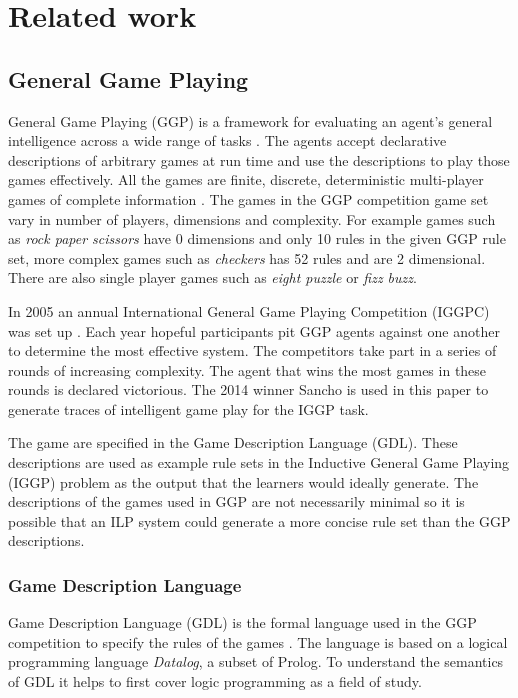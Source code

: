 \chapter{Related work}

\section{General Game Playing}

General Game Playing (GGP) is a framework for evaluating an agent's general intelligence across a wide range of tasks \cite{Cropper/IGGP,Genesereth/GGPOverview}. The agents accept declarative descriptions of arbitrary games at run time and use the descriptions to play those games effectively. All the games are finite, discrete, deterministic multi-player games of complete information \cite{GDL_Spec}. The games in the GGP competition game set vary in number of players, dimensions and complexity. For example games such as \textit{rock paper scissors} have 0 dimensions and only 10 rules in the given GGP rule set, more complex games such as \textit{checkers} has 52 rules and are 2 dimensional. There are also single player games such as \textit{eight puzzle} or \textit{fizz buzz}.

In 2005 an annual International General Game Playing Competition (IGGPC) was set up \cite{Kowalski/GGP}. Each year hopeful participants pit GGP agents against one another to determine the most effective system. The competitors take part in a series of rounds of increasing complexity. The agent that wins the most games in these rounds is declared victorious. The 2014 winner Sancho is used in this paper to generate traces of intelligent game play for the IGGP task.

The game are specified in the Game Description Language (GDL). These descriptions are used as example rule sets in the Inductive General Game Playing (IGGP) problem as the output that the learners would ideally generate. The descriptions of the games used in GGP are not necessarily minimal so it is possible that an ILP system could generate a more concise rule set than the GGP descriptions.

\subsection{Game Description Language}\label{sec:GDL}
Game Description Language (GDL) is the formal language used in the GGP competition to specify the rules of the games \cite{GDL_Spec}. The language is based on a logical programming language \textit{Datalog}, a subset of Prolog. To understand the semantics of GDL it helps to first cover logic programming as a field of study.
